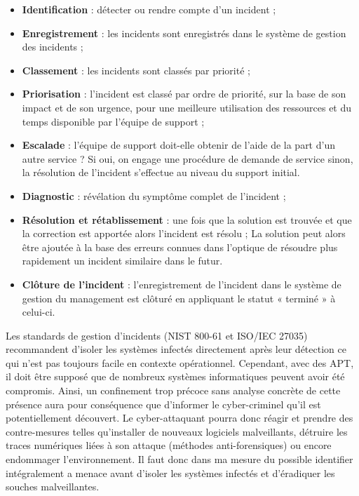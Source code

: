 \begin{itemize}
  \item \textbf{Identification} : détecter ou rendre compte d’un incident ;
  \item \textbf{Enregistrement} : les incidents sont enregistrés dans le système de gestion des incidents ;
  \item \textbf{Classement}  : les incidents sont classés par priorité ;
  \item \textbf{Priorisation} : l’incident est classé par ordre de priorité, sur la base de son impact et de son urgence, pour une meilleure utilisation des ressources et du temps disponible par l’équipe de support ;
  \item \textbf{Escalade}  : l’équipe de support doit-elle obtenir de l’aide de la part d’un autre service ? Si oui, on engage une procédure de demande de service sinon, la résolution de l'incident s’effectue au niveau du support initial.
  \item \textbf{Diagnostic}  : révélation du symptôme complet de l’incident ;
  \item \textbf{Résolution et rétablissement } : une fois que la solution est trouvée et que la correction est apportée alors l’incident est résolu ; La solution peut alors être ajoutée à la base des erreurs connues dans l'optique de résoudre plus rapidement un incident similaire dans le futur.
  \item \textbf{Clôture de l’incident}  : l’enregistrement de l’incident dans le système de gestion du management est clôturé en appliquant le statut « terminé » à celui-ci.
\end{itemize}


Les standards de gestion d’incidents (NIST 800-61 et ISO/IEC 27035) recommandent d’isoler les systèmes infectés directement après leur détection ce qui n'est pas toujours facile en contexte opérationnel. Cependant,  avec des APT, il doit être supposé que de nombreux systèmes informatiques peuvent avoir été compromis.  Ainsi, un confinement trop précoce sans analyse concrète de cette présence aura pour conséquence que d’informer le cyber-criminel qu'il est potentiellement découvert. Le cyber-attaquant pourra donc réagir et prendre des contre-mesures telles qu’installer de nouveaux logiciels malveillants, détruire les traces numériques liées à son attaque (méthodes anti-forensiques) ou encore endommager l’environnement. Il faut donc dans ma mesure du possible identifier intégralement a menace avant d’isoler les systèmes infectés et d’éradiquer les souches malveillantes.

